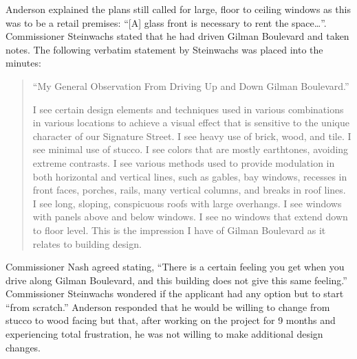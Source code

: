 Anderson explained the plans still called for large, floor to ceiling windows as
this was to be a retail premises: ``[A] glass front is necessary to rent the
space\ldots''. Commissioner Steinwachs stated that he had driven Gilman
Boulevard and taken notes. The following verbatim statement by Steinwachs was
placed into the minutes:
\begin{quotation}
\noindent ``My General Observation From Driving Up and Down Gilman Boulevard.''

I see certain design elements and techniques used in various combinations in
various locations to achieve a visual effect that is sensitive to the
unique character of our Signature Street. I see heavy use of brick, wood, and
tile. I see minimal use of stucco. I see colors that are mostly earthtones,
avoiding extreme contrasts. I see various methods used to provide modulation in
both horizontal and vertical lines, such as gables, bay windows, recesses in
front faces, porches, rails, many vertical columns, and breaks in roof lines. I
see long, sloping, conspicuous roofs with large overhangs. I see windows with
panels above and below windows. I see no windows that extend down to floor
level. This is the impression I have of Gilman Boulevard as it relates to
building design.
\end{quotation}

Commissioner Nash agreed stating, ``There is a certain feeling you get when you
drive along Gilman Boulevard, and this building does not give this same
feeling.'' Commissioner Steinwachs wondered if the applicant had any option but
to start ``from scratch.'' Anderson responded that he would be willing to change
from stucco to wood facing but that, after working on the project for 9 months
and experiencing total frustration, he was not willing to make additional design
changes.

